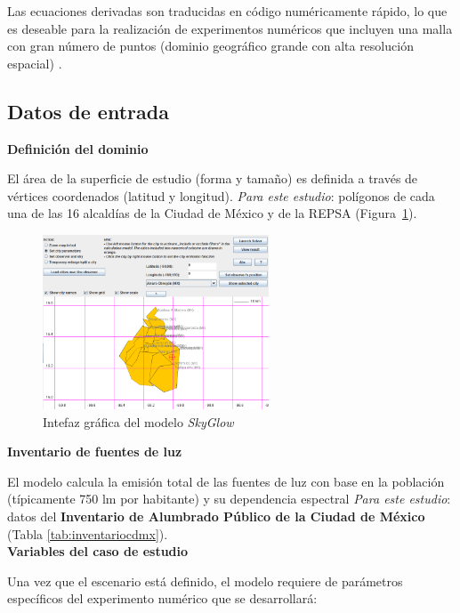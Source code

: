 Las ecuaciones derivadas son traducidas en código numéricamente rápido, lo que es deseable para la realización de experimentos numéricos que incluyen una malla con gran número de puntos (dominio geográfico grande con alta resolución espacial) \citep{Kocifaj2007,Linares2018}.\\

\subsection{Datos de entrada}

\textbf{Definición del dominio}

El área de la superficie de estudio (forma y tamaño) es definida a través de vértices coordenados (latitud y longitud). \textit{Para este estudio}: polígonos de cada una de las 16 alcaldías de la Ciudad de México y de la REPSA (Figura~\ref{ciudaddemexicomodelo}).

\newpage

\begin{figure}
  \centering
    \includegraphics[width=0.6\textwidth]{ciudaddemexicomodelo}
  \caption{Intefaz gráfica del modelo \textit{SkyGlow}}
  \label{ciudaddemexicomodelo}
\end{figure}

\textbf{Inventario de fuentes de luz}

El modelo calcula la emisión total de las fuentes de luz con base en la población (típicamente 750 lm por habitante) y su dependencia espectral \textit{Para este estudio}: datos del \textbf{Inventario de Alumbrado Público de la Ciudad de México} (Tabla \ref{tab:inventariocdmx}).\\

\textbf{Variables del caso de estudio}

Una vez que el escenario está definido, el modelo requiere de parámetros específicos del experimento numérico que se desarrollará:

